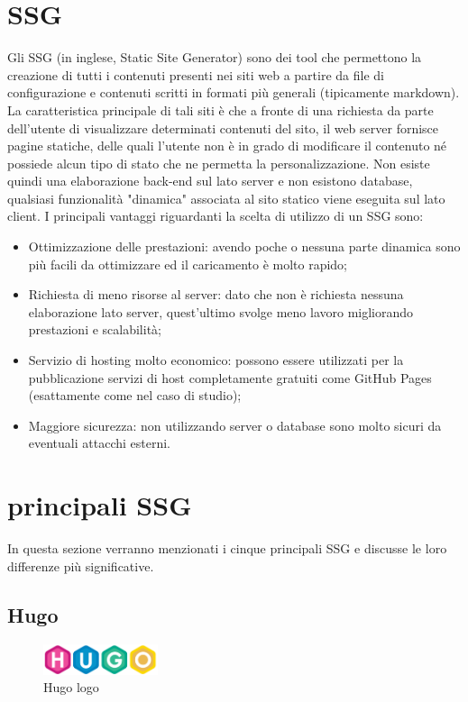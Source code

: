 \documentclass[target=bach,aauheader=]{thud}
\begin{document}
\section{SSG}\label{sec:SSG}
Gli SSG (in inglese, Static Site Generator) sono dei tool che permettono la creazione di tutti i contenuti presenti nei siti web a partire da file di configurazione e contenuti scritti in formati più generali (tipicamente markdown).
La caratteristica principale di tali siti è che a fronte di una richiesta da parte dell'utente di visualizzare determinati contenuti del sito, il web server fornisce pagine statiche, delle quali l'utente non è in grado di modificare il contenuto né possiede alcun tipo di stato che ne permetta la personalizzazione. Non esiste quindi una elaborazione back-end sul lato server e non esistono database, qualsiasi funzionalità "dinamica" associata al sito statico viene eseguita sul lato client. \newline
I principali vantaggi riguardanti la scelta di utilizzo di un SSG sono:
\begin{itemize}
\item Ottimizzazione delle prestazioni: avendo poche o nessuna parte dinamica sono più facili da ottimizzare ed il caricamento è molto rapido;
\item Richiesta di meno risorse al server: dato che non è richiesta nessuna elaborazione lato server, quest'ultimo svolge meno lavoro migliorando prestazioni e scalabilità;
\item Servizio di hosting molto economico: possono essere utilizzati per la pubblicazione servizi di host completamente gratuiti come GitHub Pages (esattamente come nel caso di studio);
\item Maggiore sicurezza: non utilizzando server o database sono molto sicuri da eventuali attacchi esterni.
\end{itemize}

\section{principali SSG}
In questa sezione verranno menzionati i cinque principali SSG e discusse le loro differenze più significative. 

\subsection{Hugo}\label{subsec:shugo}
\begin{figure}
    \centering
    \includegraphics[width = 0.3\textwidth]{images/Hugo_logo.png}
    \caption{Hugo logo}
\end{figure}
\end{document}
